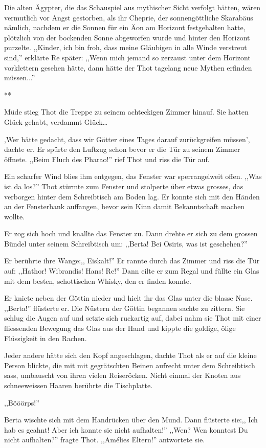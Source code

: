 \documentclass[11pt,titlepage,a5paper]{book}
\newcommand{\sterne}{\par{\centering ***\par}}
\begin{document}
Die alten Ägypter, die das Schauspiel aus mythischer Sicht verfolgt hätten, wären vermutlich vor Angst gestorben, als ihr Cheprie, der sonnengöttliche Skarabäus nämlich, nachdem er die Sonnen für ein Äon am Horizont festgehalten hatte, plötzlich von der bockenden Sonne abgeworfen wurde und hinter den Horizont purzelte. ,,Kinder, ich bin froh, dass meine Gläubigen in alle Winde verstreut sind,'' erklärte Re später: ,,Wenn mich jemand so zerzaust unter dem Horizont vorklettern gesehen hätte, dann hätte der Thot tagelang neue Mythen erfinden müssen...''

\sterne

Müde stieg Thot die Treppe zu seinem achteckigen Zimmer hinauf. Sie hatten Glück gehabt, verdammt Glück\dots 

,Wer hätte gedacht, dass wir Götter eines Tages darauf zurückgreifen müssen', dachte er. Er spürte den Luftzug schon bevor er die Tür zu seinem Zimmer öffnete. ,,Beim Fluch des Pharao!'' rief Thot und riss die Tür auf. 

Ein scharfer Wind blies ihm entgegen, das Fenster war sperrangelweit offen. ,,Was ist da los?'' Thot stürmte zum Fenster und stolperte über etwas grosses, das verborgen hinter dem Schreibtisch am Boden lag. Er konnte sich mit den Händen an der Fensterbank auffangen, bevor sein Kinn damit Bekanntschaft machen wollte.

Er zog sich hoch und knallte das Fenster zu. Dann drehte er sich zu dem grossen Bündel unter seinem Schreibtisch um: ,,Berta! Bei Osiris, was ist geschehen?''

Er berührte ihre Wange:,, Eiskalt!'' Er rannte durch das Zimmer und riss die Tür auf: ,,Hathor! Wibrandis! Hans! Re!'' Dann eilte er zum Regal und füllte ein Glas mit dem besten, schottischen Whisky, den er finden konnte.

Er kniete neben der Göttin nieder und hielt ihr das Glas unter die blasse Nase. ,,Berta!'' flüsterte er. Die Nüstern der Göttin begannen sachte zu zittern. Sie schlug die Augen auf und setzte sich ruckartig auf, dabei nahm sie Thot mit einer fliessenden Bewegung das Glas aus der Hand und kippte die goldige, ölige Flüssigkeit in den Rachen.

Jeder andere hätte sich den Kopf angeschlagen, dachte Thot als er auf die kleine Person blickte, die mit mit gegrätschten Beinen aufrecht unter dem Schreibtisch sass, umbauscht von ihren vielen Reiseröcken. Nicht einmal der Knoten aus schneeweissen Haaren berührte die Tischplatte.

\begin{Large}
,,Bööörps!''
\end{Large} Berta wischte sich mit dem Handrücken über den Mund. Dann flüsterte sie:,, Ich hab es geahnt! Aber ich konnte sie nicht aufhalten!'' ,,Wen? Wen konntest Du nicht aufhalten?'' fragte Thot. ,,Amélies Eltern!'' antwortete sie.
\end{document}
